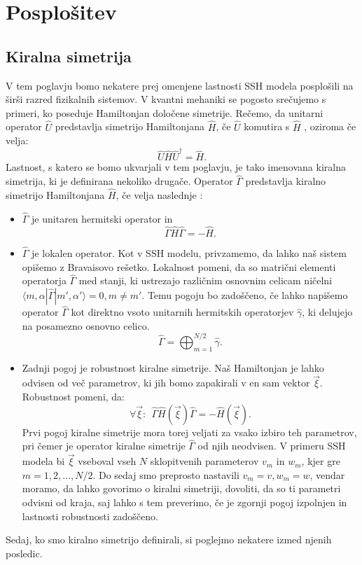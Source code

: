 \section{Posplošitev}
\subsection{Kiralna simetrija}
V tem poglavju bomo nekatere prej omenjene lastnosti SSH modela posplošili na širši razred fizikalnih sistemov.
V kvantni mehaniki se pogosto srečujemo s primeri, ko poseduje Hamiltonjan določene simetrije. Rečemo, da unitarni operator $\hat{U}$ predstavlja simetrijo Hamiltonjana $\hat{H}$, če $\hat{U}$ komutira s $\hat{H}$ \cite{symmetry}, oziroma če velja:
\begin{equation}
\hat{U} \hat{H} \hat{U}^\dagger = \hat{H}.
\end{equation}
Lastnost, s katero se bomo ukvarjali v tem poglavju, je tako imenovana kiralna simetrija, ki je definirana nekoliko drugače. Operator $\hat{\Gamma}$ predstavlja kiralno simetrijo Hamiltonjana $\hat{H}$, če velja naslednje \cite{madzar}:
\begin{itemize}
 \item $\hat{\Gamma}$ je unitaren hermitski operator in
\begin{equation}
\hat{\Gamma} \hat{H} \hat{\Gamma} = - \hat{H}.
\end{equation}
\item $\hat{\Gamma}$ je lokalen operator. Kot v SSH modelu, privzamemo, da lahko naš sistem opišemo z Bravaisovo rešetko. Lokalnost pomeni, da so matrični elementi operatorja $\hat{\Gamma}$ med stanji, ki ustrezajo različnim osnovnim celicam ničelni $\langle m, \alpha | \hat{\Gamma} | m' , \alpha' \rangle = 0,  m \neq m'$. Temu pogoju bo zadoščeno, če lahko napišemo operator $\hat{\Gamma}$ kot direktno vsoto unitarnih hermitskih operatorjev $\hat{\gamma}$, ki delujejo na posamezno osnovno celico.
\begin{equation}
\hat{\Gamma} = \bigoplus_{m=1}^{N/2} \hat{\gamma}.
\end{equation}
\item Zadnji pogoj je robustnost kiralne simetrije. Naš Hamiltonjan je lahko odvisen od več parametrov, ki jih bomo zapakirali v en sam vektor $\vec{\xi}$. Robustnost pomeni, da:
\begin{equation}
\forall \vec{\xi}:\ \    \hat{\Gamma} \hat{H}(\vec{\xi}) \hat{\Gamma} = - \hat{H}(\vec{\xi}).
\end{equation}
Prvi pogoj kiralne simetrije mora torej veljati za vsako izbiro teh parametrov, pri čemer je operator kiralne simetrije $\hat{\Gamma}$ od njih neodvisen. V primeru SSH modela bi $\vec{\xi}$ vseboval vseh $N$ sklopitvenih parameterov $v_m$ in $w_m$, kjer gre $m=1,2, \dots ,N/2$. Do sedaj smo preprosto nastavili $v_m = v, w_m = w$, vendar moramo, da lahko govorimo o kiralni simetriji, dovoliti, da so ti parametri odvisni od kraja, saj lahko s tem preverimo, če je zgornji pogoj izpolnjen in lastnosti robustnosti zadoščeno.
\end{itemize}
Sedaj, ko smo kiralno simetrijo definirali, si poglejmo nekatere izmed njenih posledic.
